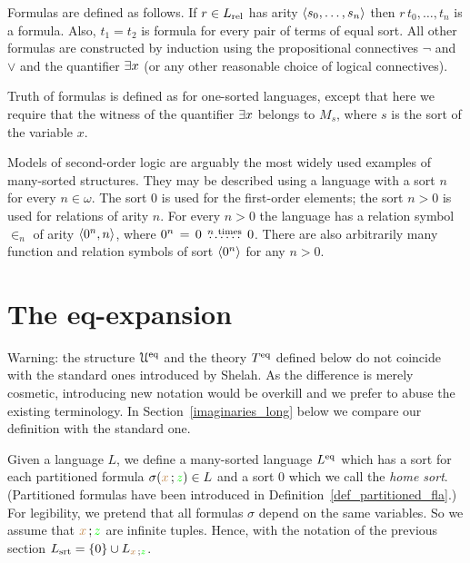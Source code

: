 Formulas are defined as follows.
If $r\in L_{\rm rel}$ has arity $\langle s_0,\dots,s_n\rangle$ then $r\,t_0,\dots,t_n$ is a formula.
Also, $t_1=t_2$ is formula for every pair of terms of equal sort.
All other formulas are constructed by induction using the propositional connectives $\neg$ and $\vee$ and the quantifier $\exists x$ (or any other reasonable choice of logical connectives).

Truth of formulas is defined as for one-sorted languages, except that here we require that the witness of the quantifier $\exists x$ belongs to $M_s$, where $s$ is the sort of the variable $x$.

Models of second-order logic are arguably the most widely used examples of many-sorted structures.
They may be described using a language with a sort $n$ for every $n\in\omega$.
The sort $0$ is used for the first-order elements; the sort $n>0$ is used for relations of arity $n$.
For every $n>0$ the language has a relation symbol $\in_n$ of arity $\langle0^n,n\rangle$, where $0^n\,=\, 0\,\stackrel{n\ \rm times}{\dots\dots}\,0$.
%
%
There are also arbitrarily many function and relation symbols of sort $\langle0^n\rangle$ for any $n>0$.

\section{The eq-expansion}\label{immaginari}

\noindent\llap{\textcolor{red}{\Large\warning}\kern1.5ex}Warning: the structure $\EuScript U^{{\rm eq}}$ and the theory $T^{{\rm eq}}$ defined below do not coincide with the standard ones introduced by Shelah.
As the difference is merely cosmetic, introducing new notation would be overkill and we prefer to abuse the existing terminology.
In Section~\ref{imaginaries_long} below we compare our definition with the standard one.

Given a language $L$, we define a many-sorted language \emph{$L^{{{\rm eq}}}$\/} which has a sort for each partitioned formula $\sigma({\color{brown} x}\,;{\color{green} z})\in L$ and a sort \emph{$0$\/} which we call the \emph{home sort}.
(Partitioned formulas have been introduced in Definition~\ref{def_partitioned_fla}.)
For legibility, we pretend that all formulas $\sigma$ depend on the same variables. 
So we assume that ${\color{brown} x}\,;{\color{green} z}$ are infinite tuples.
Hence, with the notation of the previous section $L_{\rm srt}=\{0\}\cup L_{{\color{brown} x}\,;{\color{green} z}}$. 


